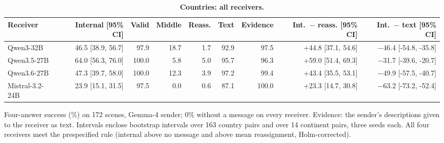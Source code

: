 \begin{table}[!htbp]
\caption{\textbf{Countries: all receivers.}}
\label{tab:countries_full}
\centering\scriptsize
\setlength{\tabcolsep}{2pt}
\begin{tabular*}{\linewidth}{@{\extracolsep{\fill}}lrrrrrrrr@{}}
\toprule
Receiver & Internal [95\% CI] & Valid & Middle & Reass. & Text & Evidence & Int.\ $-$ reass. [95\% CI] & Int.\ $-$ text [95\% CI] \\
\midrule
Qwen3-32B & 46.5 [38.9, 56.7] & 97.9 & 18.7 & 1.7 & 92.9 & 97.5 & +44.8 [37.1, 54.6] & $-$46.4 [-54.8, -35.8] \\
Qwen3.5-27B & 64.0 [56.3, 76.0] & 100.0 & 5.8 & 5.0 & 95.7 & 96.3 & +59.0 [51.4, 69.3] & $-$31.7 [-39.6, -20.7] \\
Qwen3.6-27B & 47.3 [39.7, 58.0] & 100.0 & 12.3 & 3.9 & 97.2 & 99.4 & +43.4 [35.5, 53.1] & $-$49.9 [-57.5, -40.7] \\
Mistral-3.2-24B & 23.9 [15.1, 31.5] & 97.5 & 0.0 & 0.6 & 87.1 & 100.0 & +23.3 [14.7, 30.8] & $-$63.2 [-73.2, -52.4] \\
\bottomrule
\end{tabular*}
\par\vspace{3pt}
{\footnotesize\raggedright Four-answer success (\%) on 172 scenes, Gemma-4 sender; 0\% without a message on every receiver. Evidence: the sender's descriptions given to the receiver as text. Intervals enclose bootstrap intervals over 163 country pairs and over 14 continent pairs, three seeds each. All four receivers meet the prespecified rule (internal above no message and above mean reassignment, Holm-corrected).\par}
\end{table}
